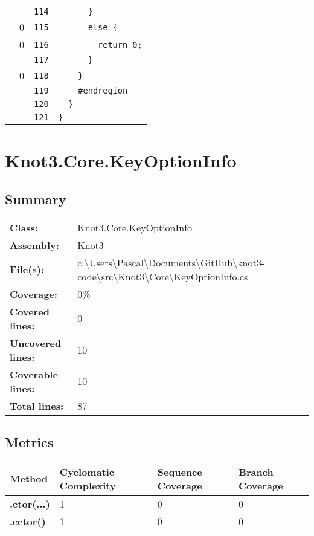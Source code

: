 \documentclass[a4paper,10pt]{article}
\begin{document}
\begin{longtable}[l]{lrrl}
\cellcolor{gray} &  & \verb~114~ & \verb~      }~\\
\cellcolor{red} & 0 & \verb~115~ & \verb~      else {~\\
\cellcolor{red} & 0 & \verb~116~ & \verb~        return 0;~\\
\cellcolor{gray} &  & \verb~117~ & \verb~      }~\\
\cellcolor{red} & 0 & \verb~118~ & \verb~    }~\\
\cellcolor{gray} &  & \verb~119~ & \verb~    #endregion~\\
\cellcolor{gray} &  & \verb~120~ & \verb~  }~\\
\cellcolor{gray} &  & \verb~121~ & \verb~}~\\
\end{longtable}
\newpage
\section{Knot3.Core.KeyOptionInfo}
\subsection{Summary}
\begin{longtable}[l]{ll}
\textbf{Class:} & Knot3.Core.KeyOptionInfo\\
\textbf{Assembly:} & Knot3\\
\textbf{File(s):} & \begin{minipage}[t]{12cm}{c:\textbackslash Users\textbackslash Pascal\textbackslash Documents\textbackslash GitHub\textbackslash knot3-code\textbackslash src\textbackslash Knot3\textbackslash Core\textbackslash KeyOptionInfo.cs}\end{minipage} \\
\textbf{Coverage:} & 0\%\\
\textbf{Covered lines:} & 0\\
\textbf{Uncovered lines:} & 10\\
\textbf{Coverable lines:} & 10\\
\textbf{Total lines:} & 87\\
\end{longtable}
\subsection{Metrics}
\begin{longtable}[l]{|l|l|l|l|}
\hline
\textbf{Method} & \textbf{Cyclomatic Complexity} & \textbf{Sequence Coverage} & \textbf{Branch Coverage}\\
\hline
\textbf{.ctor(...)} & 1 & 0 & 0\\
\hline
\textbf{.cctor()} & 1 & 0 & 0\\
\hline
\end{longtable}
\end{document}
